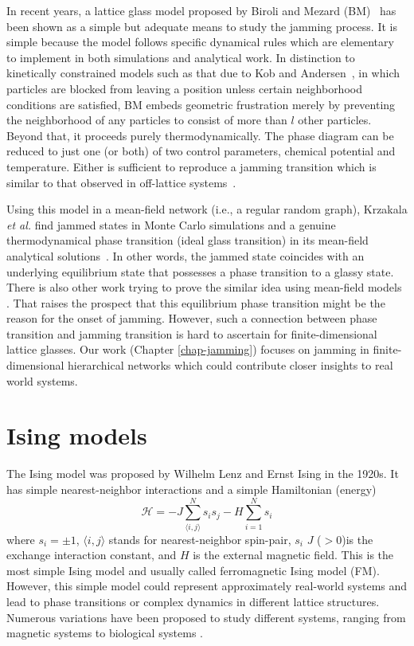 In recent years, a lattice glass model proposed by Biroli and Mezard
(BM)~\cite{Biroli02} has been shown as a simple but adequate means
to study the jamming process. It is simple because the model follows
specific dynamical rules which are elementary to implement in both
simulations and analytical work. In distinction to kinetically constrained
models such as that due to Kob and Andersen~\cite{Kob93}, in which
particles are blocked from leaving a position unless certain neighborhood
conditions are satisfied, BM embeds geometric frustration merely by
preventing the neighborhood of any particles to consist of more than
$l$ other particles. Beyond that, it proceeds purely thermodynamically.
The phase diagram can be reduced to just one (or both) of two control
parameters, chemical potential and temperature. Either is sufficient
to reproduce a jamming transition which is similar to that observed
in off-lattice systems~\cite{Biroli02}. 

Using this model in a mean-field network 
(i.e., a regular random graph), Krzakala \textit{et al.} find
jammed states in Monte Carlo simulations and a genuine thermodynamical
phase transition (ideal glass transition) in its mean-field analytical
solutions~\cite{Krzakala2008}. In other words, the jammed state coincides
with an underlying equilibrium state that possesses a phase transition
to a glassy state. There is also other work trying to prove the similar idea using mean-field models \cite{Rivoire03,berthier2011theory, Parisi2010}. That raises the prospect that this equilibrium phase transition might be the reason for the onset of jamming. However, such a connection between phase transition and jamming transition is hard to ascertain for finite-dimensional lattice glasses. Our work (Chapter \ref{chap-jamming}) focuses on jamming in finite-dimensional hierarchical networks which could contribute closer insights to real world systems.



\section{Ising models}
The Ising model was proposed by Wilhelm Lenz and Ernst Ising \cite{ising1925contribution, brush1967history} in the 1920s. It has simple nearest-neighbor interactions and a simple Hamiltonian (energy)
\begin{equation}
\mathcal{H}=-J \sum_{\langle i, j\rangle}^N s_i s_j - H \sum_{i=1}^N s_i
\label{eq:intro-ising}
\end{equation}
where $s_i=\pm1$, $\langle i, j\rangle$ stands for nearest-neighbor spin-pair, $s_i$ $J$ ($>0$)is the exchange interaction constant, and $H$ is the external magnetic field. This is the most simple Ising model and usually called ferromagnetic Ising model (FM).
However, this simple model could represent approximately real-world systems and lead to phase transitions \cite{onsager1944} or complex dynamics \cite{Fredrickson1984} in different lattice structures. 
Numerous variations have been proposed to study different systems, ranging from magnetic systems \cite{blundell2001magnetism} to biological systems \cite{hopfield1982neural}.

